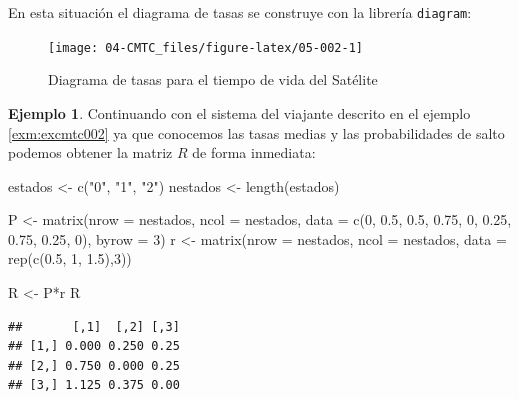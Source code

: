 \documentclass[
]{book}
\newenvironment{Shaded}{\begin{snugshade}}{\end{snugshade}}
\newcommand{\AttributeTok}[1]{\textcolor[rgb]{0.77,0.63,0.00}{#1}}
\newcommand{\DecValTok}[1]{\textcolor[rgb]{0.00,0.00,0.81}{#1}}
\newcommand{\FloatTok}[1]{\textcolor[rgb]{0.00,0.00,0.81}{#1}}
\newcommand{\FunctionTok}[1]{\textcolor[rgb]{0.00,0.00,0.00}{#1}}
\newcommand{\NormalTok}[1]{#1}
\newcommand{\OtherTok}[1]{\textcolor[rgb]{0.56,0.35,0.01}{#1}}
\newcommand{\SpecialCharTok}[1]{\textcolor[rgb]{0.00,0.00,0.00}{#1}}
\newcommand{\StringTok}[1]{\textcolor[rgb]{0.31,0.60,0.02}{#1}}
\theoremstyle{definition}
\theoremstyle{definition}
\newtheorem{example}{Ejemplo}[chapter]
\theoremstyle{definition}
\theoremstyle{definition}
\theoremstyle{remark}
\begin{document}
En esta situación el diagrama de tasas se construye con la librería \texttt{diagram}:

\begin{figure}

{\centering \texttt{[image: 04-CMTC\_files/figure-latex/05-002-1]} 

}

\caption{Diagrama de tasas para el tiempo de vida del Satélite}\label{fig:05-002}
\end{figure}

\begin{example}
\protect\hypertarget{exm:excmtc004}{}\label{exm:excmtc004}Continuando con el sistema del viajante descrito en el ejemplo \ref{exm:excmtc002} ya que conocemos las tasas medias y las probabilidades de salto podemos obtener la matriz \(R\) de forma inmediata:
\end{example}

\begin{Shaded}
\begin{Highlighting}[]
\NormalTok{estados }\OtherTok{\textless{}{-}} \FunctionTok{c}\NormalTok{(}\StringTok{"0"}\NormalTok{, }\StringTok{"1"}\NormalTok{, }\StringTok{"2"}\NormalTok{)}
\NormalTok{nestados }\OtherTok{\textless{}{-}} \FunctionTok{length}\NormalTok{(estados)}

\NormalTok{P }\OtherTok{\textless{}{-}} \FunctionTok{matrix}\NormalTok{(}\AttributeTok{nrow =}\NormalTok{ nestados, }\AttributeTok{ncol =}\NormalTok{ nestados, }
            \AttributeTok{data =} \FunctionTok{c}\NormalTok{(}\DecValTok{0}\NormalTok{, }\FloatTok{0.5}\NormalTok{, }\FloatTok{0.5}\NormalTok{, }\FloatTok{0.75}\NormalTok{, }\DecValTok{0}\NormalTok{, }\FloatTok{0.25}\NormalTok{, }\FloatTok{0.75}\NormalTok{, }\FloatTok{0.25}\NormalTok{, }\DecValTok{0}\NormalTok{), }
            \AttributeTok{byrow =} \DecValTok{3}\NormalTok{)}
\NormalTok{r }\OtherTok{\textless{}{-}} \FunctionTok{matrix}\NormalTok{(}\AttributeTok{nrow =}\NormalTok{ nestados, }\AttributeTok{ncol =}\NormalTok{ nestados, }
            \AttributeTok{data =} \FunctionTok{rep}\NormalTok{(}\FunctionTok{c}\NormalTok{(}\FloatTok{0.5}\NormalTok{, }\DecValTok{1}\NormalTok{, }\FloatTok{1.5}\NormalTok{),}\DecValTok{3}\NormalTok{))}

\NormalTok{R }\OtherTok{\textless{}{-}}\NormalTok{ P}\SpecialCharTok{*}\NormalTok{r}
\NormalTok{R}
\end{Highlighting}
\end{Shaded}

\begin{verbatim}
##       [,1]  [,2] [,3]
## [1,] 0.000 0.250 0.25
## [2,] 0.750 0.000 0.25
## [3,] 1.125 0.375 0.00
\end{verbatim}
\end{document}
